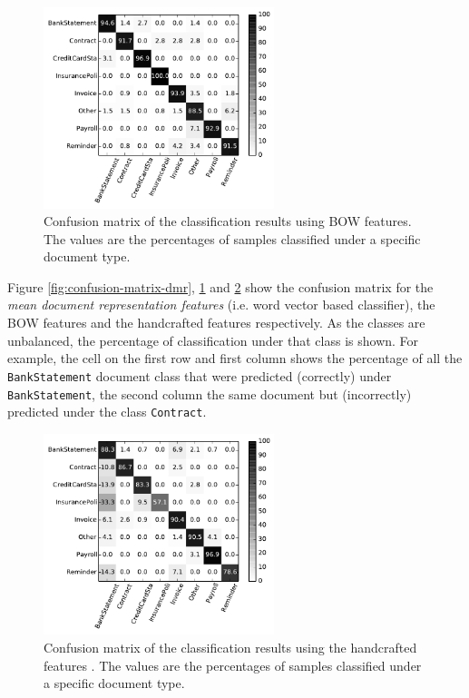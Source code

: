 \begin{figure}[!htbp]
    \centering
    \includegraphics[width=0.6\textwidth]{images/003-xvalidaton-bow.pdf}
    \caption{Confusion matrix of the classification results  using \ac{BOW}
      features. The values are the percentages of samples
    classified under a specific document type.}
    \label{fig:confusion-matrix-bow}
\end{figure}


Figure \ref{fig:confusion-matrix-dmr},  \ref{fig:confusion-matrix-bow} and 
\ref{fig:confusion-matrix-handcrafted} show the confusion matrix for the
\textit{mean document representation features} (i.e. word vector based
classifier),  the \ac{BOW} features  and the handcrafted features
respectively. As the classes are unbalanced, the percentage of classification
under that class is  shown.  For example, the cell on
the first row and first column shows the percentage of all the
\texttt{BankStatement} document class that were predicted  (correctly) under
\texttt{BankStatement}, the second column the same document but (incorrectly)
 predicted under the class \texttt{Contract}.   


 \begin{figure}[!htpb]
    \centering
    \includegraphics[width=0.6\textwidth]{images/004-xvalidaton-handcrafted.pdf}
    \caption{Confusion matrix of the classification results  using the
      handcrafted features . The values are the percentages of samples
    classified under a specific document type.}
    \label{fig:confusion-matrix-handcrafted}
\end{figure}

